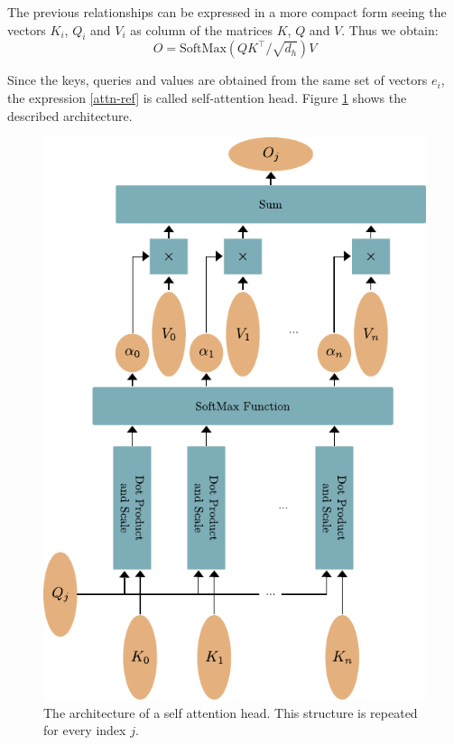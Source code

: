 \documentclass[]{marticle}
\begin{document}
The previous relationships can be expressed in a more compact form seeing the vectors $K_i$, $Q_i$
and $V_i$ as column of the matrices $K$, $Q$ and $V$. Thus we obtain:
\begin{equation}\label{attn-ref}
O = \text{SoftMax} (Q K^\top/\sqrt{d_h})V
\end{equation}

Since the keys, queries and values are obtained from the same set of vectors $e_i$, the expression
\ref{attn-ref} is called self-attention head. Figure \ref{fig:attention-head} shows the described
architecture.

\begin{figure}[!tb] 
\begin{center}
\includegraphics{self_attention_architecture.pdf}
\caption{The architecture of a self attention head. This structure is repeated for every index $j$.} 
\label{fig:attention-head} 
\end{center}
\end{figure}
\end{document}

